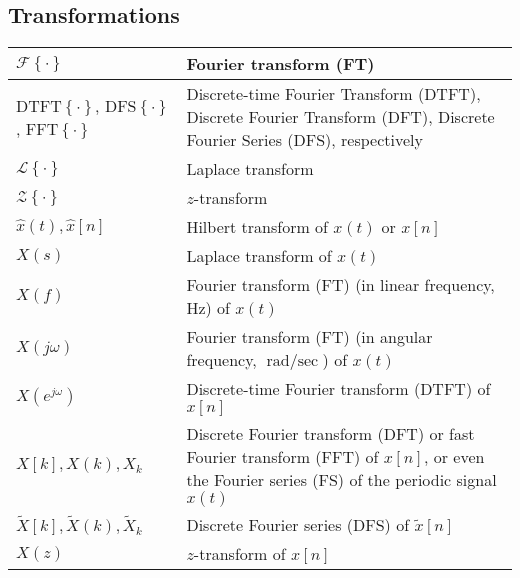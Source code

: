 \documentclass{article}
\begin{document}
\subsection{Transformations}
\begin{xltabular}{\textwidth}{XX}
	\(\mathcal{F}\left\{ \cdot \right\}\)       & Fourier transform (FT)                                                                                                                             \\ \hline
	\(\mathrm{DTFT}\left\{ \cdot \right\}\), \(\mathrm{DFS}\left\{ \cdot \right\}\), \(\mathrm{FFT}\left\{ \cdot \right\}\)       & Discrete-time Fourier Transform (DTFT), Discrete Fourier Transform (DFT), Discrete Fourier Series (DFS), respectively \\ \hline
	\(\mathcal{L}\left\{ \cdot \right\}\)       & Laplace transform                                                                                                                             \\ \hline
	\(\mathcal{Z}\left\{ \cdot \right\}\)       & \(z\)-transform                                                                                                                               \\ \hline
	\(\hat{x}(t), \hat{x}[n]\)                  & Hilbert transform of \(x(t)\) or \(x[n]\)                                                                                                     \\ \hline
	\(X(s)\)                                    & Laplace transform of \(x(t)\)                                                                                                                 \\ \hline
	\(X(f)\)                                    & Fourier transform (FT) (in linear frequency, \(\unit{\Hz}\)) of \(x(t)\)                                                                      \\ \hline
	\(X(j\omega)\)                              & Fourier transform (FT) (in angular frequency, \(\unit{\radian\per\sec}\)) of \(x(t)\)                                                         \\ \hline
	\(X(e^{j\omega})\)                          & Discrete-time Fourier transform (DTFT) of \(x[n]\)                                                                                            \\ \hline
	\(X[k], X(k), X_k\)                         & Discrete Fourier transform (DFT) or fast Fourier transform (FFT) of \(x[n]\), or even the Fourier series (FS) of the periodic signal \(x(t)\) \\ \hline
	\(\tilde{X}[k], \tilde{X}(k), \tilde{X}_k\) & Discrete Fourier series (DFS) of \(\tilde{x}[n]\)                                                                                             \\ \hline
	\(X(z)\)                                    & \(z\)-transform of \(x[n]\)                                                                                                                   \\
\end{xltabular}
\end{document}

